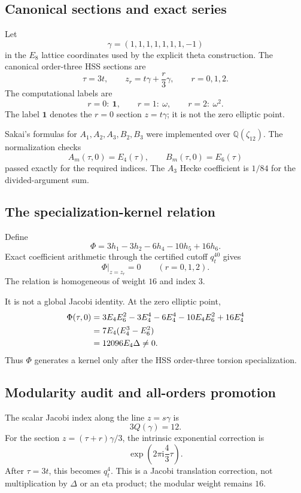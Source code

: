 \documentclass[11pt]{article}
\theoremstyle{definition}
\theoremstyle{remark}
\newcommand{\ii}{\mathrm{i}}
\newcommand{\Q}{\mathbb{Q}}
\begin{document}
\subsection{Canonical sections and exact series}

Let
\[
\gamma=(1,1,1,1,1,1,1,-1)
\]
in the $E_8$ lattice coordinates used by the explicit theta construction.  The canonical order-three HSS sections are
\begin{equation}\label{eq:torsionsections}
\tau=3t,
\qquad
z_r=t\gamma+\frac r3\gamma,
\qquad r=0,1,2.
\end{equation}
The computational labels are
\[
r=0:\ \mathbf 1,
\qquad r=1:\ \omega,
\qquad r=2:\ \omega^2.
\]
The label $\mathbf1$ denotes the $r=0$ section $z=t\gamma$; it is not the zero elliptic point.

Sakai's formulas for $A_1,A_2,A_3,B_2,B_3$ were implemented over $\Q(\zeta_{12})$.  The normalization checks
\[
A_m(\tau,0)=E_4(\tau),
\qquad
B_m(\tau,0)=E_6(\tau)
\]
passed exactly for the required indices.  The $A_3$ Hecke coefficient is $1/84$ for the divided-argument sum.

\subsection{The specialization-kernel relation}

Define
\begin{equation}\label{eq:Phi}
\Phi
=3h_1-3h_2-6h_4-10h_5+16h_6.
\end{equation}
Exact coefficient arithmetic through the certified cutoff $q_t^{40}$ gives
\[
\Phi\big|_{z=z_r}=0
\qquad(r=0,1,2).
\]
The relation is homogeneous of weight $16$ and index $3$.

It is not a global Jacobi identity.  At the zero elliptic point,
\begin{align}
\Phi(\tau,0)
&=3E_4E_6^2-3E_4^4-6E_4^4-10E_4E_6^2+16E_4^4\notag\\
&=7E_4(E_4^3-E_6^2)\notag\\
&=12096E_4\Delta\neq0.\label{eq:negativecontrol}
\end{align}
Thus $\Phi$ generates a kernel only after the HSS order-three torsion specialization.

\subsection{Modularity audit and all-orders promotion}

The scalar Jacobi index along the line $z=s\gamma$ is
\[
3Q(\gamma)=12.
\]
For the section $z=(\tau+r)\gamma/3$, the intrinsic exponential correction is
\[
\exp\left(2\pi\ii\frac43\tau\right).
\]
After $\tau=3t$, this becomes $q_t^4$.  This is a Jacobi translation correction, not multiplication by $\Delta$ or an eta product; the modular weight remains $16$.
\end{document}
